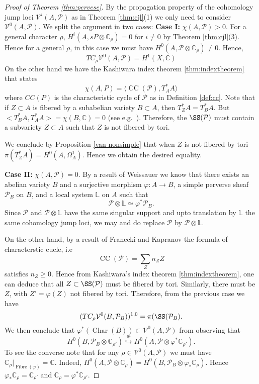 \documentclass[12pt,reqno]{amsart}
\theoremstyle{question}
\theoremstyle{definition}
\theoremstyle{remark}
\theoremstyle{cited}
\theoremstyle{citeddef}
\DeclareMathOperator{\Char}{Char}
\DeclareMathOperator{\CC}{CC}
\newcommand{\sP}{\mathcal{P}}
\newcommand\sV{{\mathcal V}}
\newcommand{\bbC}{\mathbb{C}}
\newcommand{\bbL}{\mathbb{L}}
\newcommand{\into}{\hookrightarrow}
\begin{document}
\begin{proof}[Proof of Theorem \ref{thm:pervese}]
By the propagation property of the cohomology jump loci
$\sV^i(A, \sP)$ as in Theorem \ref{thm:cjl}(1) we
only need to consider $\sV^0(A,\sP)$. We split the argument in 
two cases:
\noindent \textbf{Case I: }$\chi(A, \sP)>0$. 
For a general character $\rho$, $H^i(A, sP\otimes \bbC_{\rho})= 0$ for $i\neq 0$ by Theorem \ref{thm:cjl}(3). Hence for a general
$\rho$,
in this case we must have $H^0(A, \sP\otimes \bbC_{\rho})\neq 0$. Hence, 
\[TC_{\rho}\sV^0(A, \sP) = H^1(X,\bbC)\]
On the other hand we have
the Kashiwara index theorem \ref{thm:indextheorem}
that states
\[\chi(A,P) = \langle \CC(\sP), T^*_AA\rangle\]
where $CC(P)$ is the characteristic cycle of $\sP$ as
in Definition \ref{def:cc}.
Note that if $Z\subset A$ is fibered by a subabelian variety $B\subset A$, then $T^*_ZA = T^*_BA$. But $<T^*_BA, T^*_AA> = \chi(B, \bbC) = 0$ (see e.g.\ \cite[p.\ 124]{Dim}).  Therefore,
the $\SS(\sP)$ must contain a subvariety $Z\subset A$ such that
$Z$ is not fibered by tori. 

We conclude by Proposition \ref{van-nonsimple} that when $Z$ is not fibered by tori $\pi(T^*_ZA) = H^0(A,\Omega_A^1)$. Hence
we obtain the desired equality.

\noindent \textbf{Case II: } $\chi(A, \sP)=0$. 
By a result of Weissauer \cite[Theorem 2]{Wei}
we know that there exists an abelian variety $B$ and a surjective morphism $\varphi\colon A\to B$, a simple perverse sheaf $\sP_B$ on $B$, and a local system $\bbL$ on $A$
such that 
\[\sP\otimes \bbL\simeq \varphi^*\sP_B.\]
Since $\sP$ and $\sP\otimes \bbL$ have the same singular support
and upto translation by $\bbL$ the same cohomology jump loci, we 
may and do replace $\sP$ by $\sP\otimes \bbL$.

On the other hand, by a result of
Franecki and Kapranov
\cite[Corollary 1.4]{FK} the formula of
characterstic cucle, i.e\ \[\CC(\sP) = \sum_Z n_Z Z\]
satisfies $n_Z\geq 0$. Hence from Kashiwara's index theorem 
\ref{thm:indextheorem}, one can deduce that all $Z\subset \SS(\sP)$ must be fibered by tori. Similarly, there must be 
$Z$, with $Z' = \varphi(Z)$ not fibered by tori.
Therefore, from the previous case we have 
\[(TC_{\rho}\sV^0(B, \sP_B))^{1,0} = \pi(\SS(\sP_B).\]
We then conclude 
that $\varphi^*(\Char(B))\subset \sV^0(A, \sP)$ from observing that
\[H^0(B, \sP_B\otimes \bbC_{\rho'}) \overset{\oplus}{\into}
H^0(A, \sP\otimes \varphi^*\bbC_{\rho'}).\]
To see the converse note that 
for any $\rho \in \sV^0(A, \sP)$ we must 
have $\bbC_{\rho}|_{\operatorname{Fibre}(\varphi)} = \bbC$.
Indeed, $H^0(A, \sP\otimes \bbC_{\rho}) = H^0(B, \sP_B\otimes \varphi_*\bbC_{\rho})$.
Hence $\varphi_*\bbC_{\rho} = \bbC_{\rho'}$ and $\bbC_{\rho} = 
\varphi^*\bbC_{\rho'}$.

\end{proof}
\end{document}
